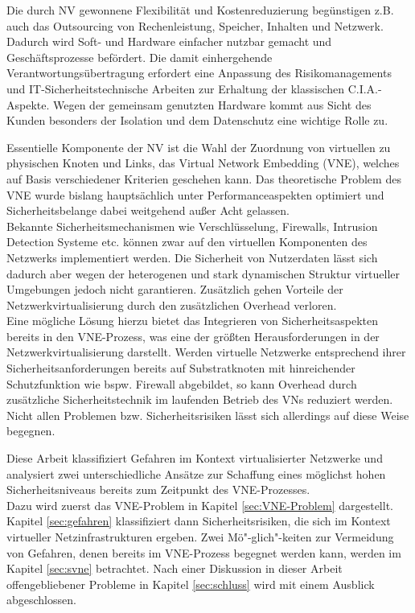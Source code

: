 Die durch NV gewonnene Flexibilität und Kostenreduzierung begünstigen z.B. auch das Outsourcing von Rechenleistung, Speicher, Inhalten und Netzwerk. Dadurch wird Soft- und Hardware einfacher nutzbar gemacht und Geschäftsprozesse befördert. 
Die damit einhergehende Verantwortungsübertragung erfordert eine Anpassung des Risikomanagements und IT-Sicherheitstechnische Arbeiten zur Erhaltung der klassischen C.I.A.-Aspekte. Wegen der gemeinsam genutzten Hardware kommt aus Sicht des Kunden besonders der Isolation und dem Datenschutz eine wichtige Rolle zu.

Essentielle Komponente der NV ist die Wahl der Zuordnung von virtuellen zu physischen Knoten und Links, das Virtual Network Embedding (VNE), welches auf Basis verschiedener Kriterien geschehen kann. Das theoretische Problem des VNE wurde bislang hauptsächlich unter Performanceaspekten optimiert und Sicherheitsbelange dabei weitgehend außer Acht gelassen.\\
Bekannte Sicherheitsmechanismen wie Verschlüsselung, Firewalls, Intrusion Detection Systeme etc. können zwar auf den virtuellen Komponenten des Netzwerks implementiert werden. Die Sicherheit von Nutzerdaten lässt sich dadurch aber wegen der heterogenen und stark dynamischen Struktur virtueller Umgebungen jedoch nicht garantieren. Zusätzlich gehen Vorteile der Netzwerkvirtualisierung durch den zusätzlichen Overhead verloren. \cite{gong2016virtual}\\
Eine mögliche Lösung hierzu bietet das Integrieren von Sicherheitsaspekten bereits in den VNE-Prozess, was eine der größten Herausforderungen in der Netzwerkvirtualisierung darstellt. \cite{fischer2013virtual}
Werden virtuelle Netzwerke entsprechend ihrer Sicherheitsanforderungen bereits auf Substratknoten mit hinreichender Schutzfunktion wie bspw. Firewall abgebildet, so kann Overhead durch zusätzliche Sicherheitstechnik im laufenden Betrieb des VNs reduziert werden. Nicht allen Problemen bzw. Sicherheitsrisiken lässt sich allerdings auf diese Weise begegnen. \cite{bays2012security, gong2016virtual, wang2016towards} 


Diese Arbeit klassifiziert Gefahren im Kontext virtualisierter Netzwerke und analysiert zwei unterschiedliche Ansätze zur Schaffung eines möglichst hohen Sicherheitsniveaus bereits zum Zeitpunkt des VNE-Prozesses.\\
Dazu wird zuerst das VNE-Problem in Kapitel \ref{sec:VNE-Problem} dargestellt. Kapitel \ref{sec:gefahren} klassifiziert dann Sicherheitsrisiken, die sich im Kontext virtueller Netzinfrastrukturen ergeben. Zwei Mö"-glich"-keiten zur Vermeidung von Gefahren, denen bereits im VNE-Prozess begegnet werden kann, werden im Kapitel \ref{sec:svne} betrachtet. Nach einer Diskussion in dieser Arbeit offengebliebener Probleme in Kapitel \ref{sec:schluss} wird mit einem Ausblick abgeschlossen.